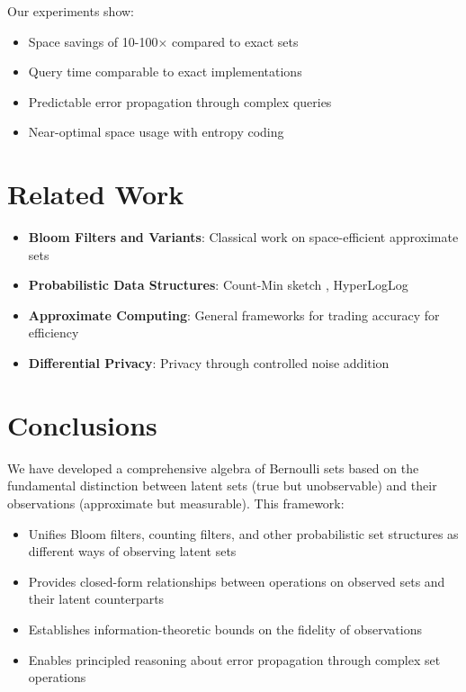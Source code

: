 \documentclass[11pt,final,hidelinks]{article}
\begin{document}
Our experiments show:
\begin{itemize}
    \item Space savings of 10-100× compared to exact sets
    \item Query time comparable to exact implementations
    \item Predictable error propagation through complex queries
    \item Near-optimal space usage with entropy coding
\end{itemize}

\section{Related Work}

\begin{itemize}
    \item \textbf{Bloom Filters and Variants}: Classical work on space-efficient approximate sets \cite{bloom1970,fan2000,fan2014}
    \item \textbf{Probabilistic Data Structures}: Count-Min sketch \cite{cormode2005}, HyperLogLog \cite{flajolet2007}
    \item \textbf{Approximate Computing}: General frameworks for trading accuracy for efficiency \cite{sampson2011}
    \item \textbf{Differential Privacy}: Privacy through controlled noise addition \cite{dwork2006}
\end{itemize}

\section{Conclusions}

We have developed a comprehensive algebra of Bernoulli sets based on the fundamental distinction between latent sets (true but unobservable) and their observations (approximate but measurable). This framework:
\begin{itemize}
    \item Unifies Bloom filters, counting filters, and other probabilistic set structures as different ways of observing latent sets
    \item Provides closed-form relationships between operations on observed sets and their latent counterparts
    \item Establishes information-theoretic bounds on the fidelity of observations
    \item Enables principled reasoning about error propagation through complex set operations
\end{itemize}
\end{document}
